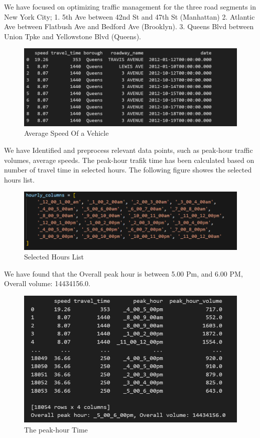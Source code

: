 We have focused on optimizing traffic management for the three road segments in New 
York City;  
1. 5th Ave between 42nd St and 47th St (Manhattan) 
2. Atlantic Ave between Flatbush Ave and Bedford Ave (Brooklyn).
3. Queens Blvd between Union Tpke and Yellowstone Blvd (Queens).
\newline
\begin{figure}[h]
    \centering
    \includegraphics[width=1\linewidth]{figures/data_from_selected_area.PNG}
    \caption{Average Speed Of a Vehicle}
    \label{fig:Data From Selected Area}
\end{figure}
\newline
\newline
We have Identified and preprocess relevant data points, such as peak-hour traffic volumes, 
average speeds. The peak-hour trafik time has been calculated based on number of travel time in selected hours. The following figure showes the selected hours list.
\newline
\begin{figure}[h]
    \centering
    \includegraphics[width=1\linewidth]{figures/hours_list.PNG}
    \caption{Selected Hours List}
    \label{fig:The peak-hour Time}
\end{figure}
We have found that the Overall peak hour is between 5.00 Pm, and 6.00 PM, Overall volume: 14434156.0.
\newline
\begin{figure}[h]
    \centering
    \includegraphics[width=1\linewidth]{figures/peak_huours_time.PNG}
    \caption{The peak-hour Time}
    \label{fig:The peak-hour Time}
\end{figure}
